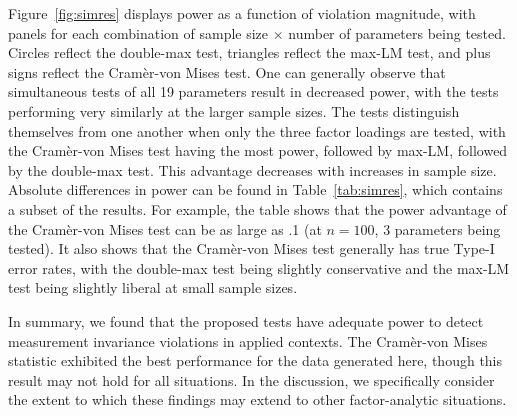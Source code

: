 \documentclass[man]{apa}
\begin{document}
Figure~\ref{fig:simres} displays power as a function of violation
magnitude, with panels for each combination of sample size $\times$
number of parameters being tested.  
Circles reflect the double-max test, triangles reflect the max-LM
test, and plus signs reflect the Cram\`{e}r-von Mises test.  One can
generally observe that simultaneous tests of all 19 parameters
result in decreased power, with the tests performing very similarly at
the larger sample sizes.  The tests distinguish themselves from one
another when only the three factor loadings are tested, with the
Cram\`{e}r-von Mises test having the most power, followed by max-LM,
followed by the double-max test.  This advantage decreases with
increases in sample size.  
Absolute differences in power can be found in Table~\ref{tab:simres},
which contains a subset of the results.  For example, the table shows that the
power advantage of the Cram\`{e}r-von
Mises test can be as large as .1 (at $n=100$, 3 parameters being
tested).  It also shows that the Cram\`{e}r-von Mises test generally
has true Type-I error rates, with the double-max test being slightly
conservative and the max-LM test being slightly liberal at small
sample sizes.

In summary, we found that the proposed tests have adequate power to detect
measurement invariance violations in applied contexts.  The 
Cram\`{e}r-von Mises statistic exhibited the best performance for the
data generated here, though this result may not hold for all
situations.  In the discussion, we specifically consider the extent to 
which these findings may extend to other factor-analytic situations.
\end{document}
